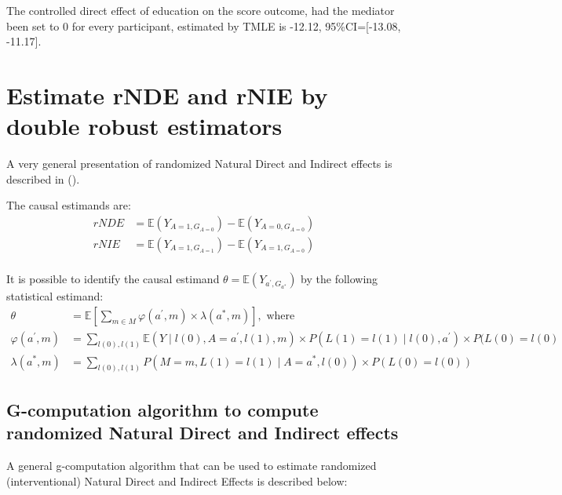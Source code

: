 \documentclass[
]{book}
\begin{document}
The controlled direct effect of education on the score outcome, had the mediator been set to 0 for every participant, estimated by TMLE is -12.12, 95\%CI={[}-13.08, -11.17{]}.

\chapter{Estimate rNDE and rNIE by double robust estimators}\label{estimate-rnde-and-rnie-by-double-robust-estimators}

A very general presentation of randomized Natural Direct and Indirect effects is described in ().

The causal estimands are:
\begin{align*}
  rNDE &= \mathbb{E}\left(Y_{A=1,G_{A=0}}\right) - \mathbb{E}\left(Y_{A=0,G_{A=0}}\right) \\
  rNIE &= \mathbb{E}\left(Y_{A=1,G_{A=1}}\right) - \mathbb{E}\left(Y_{A=1,G_{A=0}}\right) \\
\end{align*}

It is possible to identify the causal estimand \(\theta = \mathbb{E}\left(Y_{a^\prime,G_{a^*}} \right)\) by the following statistical estimand:
\begin{align*}
  \theta &= \mathbb{E}\left[ \sum_{m \in M} \varphi(a^\prime,m) \times \lambda(a^*,m) \right], \text{ where}\\
  \varphi(a^\prime,m) &= \sum_{l(0),l(1)} \mathbb{E}\left(Y \mid l(0),A=a^\prime,l(1),m\right)\times P(L(1)=l(1) \mid l(0),a^\prime) \times P(L(0)=l(0) \\
  \lambda(a^*,m) &= \sum_{l(0),l(1)} P\left(M=m,L(1)=l(1) \mid A=a^*, l(0) \right) \times P(L(0)=l(0)) 
\end{align*}

\section{G-computation algorithm to compute randomized Natural Direct and Indirect effects}\label{g-computation-algorithm-to-compute-randomized-natural-direct-and-indirect-effects}

A general g-computation algorithm that can be used to estimate randomized (interventional) Natural Direct and Indirect Effects is described below:
\end{document}
